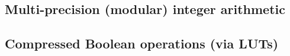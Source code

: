 
\subsection{Multi-precision (modular) integer arithmetic}


\subsection{Compressed Boolean operations (via LUTs)}


